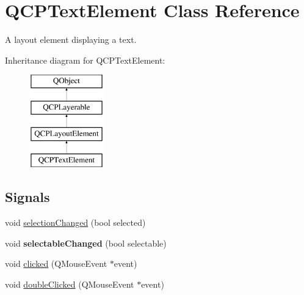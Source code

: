 \hypertarget{class_q_c_p_text_element}{}\section{Q\+C\+P\+Text\+Element Class Reference}
\label{class_q_c_p_text_element}


A layout element displaying a text.  


Inheritance diagram for Q\+C\+P\+Text\+Element\+:\begin{figure}[H]
\begin{center}
\leavevmode
\includegraphics[height=4.000000cm]{class_q_c_p_text_element}
\end{center}
\end{figure}
\subsection*{Signals}
\begin{DoxyCompactItemize}
\item 
void \mbox{\hyperlink{class_q_c_p_text_element_a49f45b87ee9c1fe866c2cdd12af17a9a}{selection\+Changed}} (bool selected)
\item 
\mbox{\label{class_q_c_p_text_element_ac4567260b52d02bfbad63357d13986c5}} 
void {\bfseries selectable\+Changed} (bool selectable)
\item 
void \mbox{\hyperlink{class_q_c_p_text_element_ad2246a0e701c0655623f048737298334}{clicked}} (Q\+Mouse\+Event $\ast$event)
\item 
void \mbox{\hyperlink{class_q_c_p_text_element_a9c6fd27ae8a7c3a02df7a6bbd3509e40}{double\+Clicked}} (Q\+Mouse\+Event $\ast$event)
\end{DoxyCompactItemize}
